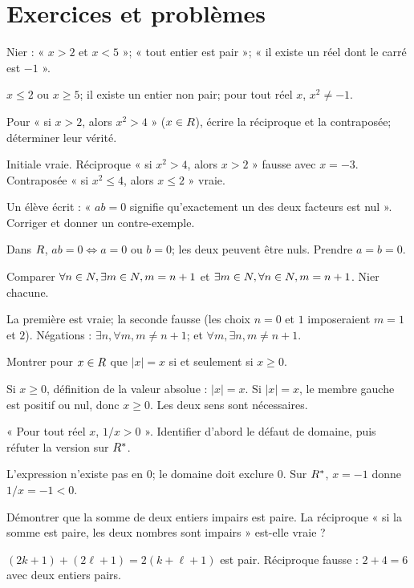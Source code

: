 \section{Exercices et problèmes}
\exo[Nier]\label{t11s-c06-e01}
Nier : « $x>2$ et $x<5$ »; « tout entier est pair »; « il existe un réel dont le carré est $-1$ ».
\begin{corrige}\label{sol-t11s-c06-e01}
$x\le2$ ou $x\ge5$; il existe un entier non pair; pour tout réel $x$, $x^2\ne-1$.
\end{corrige}
\exo[Implications]\label{t11s-c06-e02}
Pour « si $x>2$, alors $x^2>4$ » ($x\in R$), écrire la réciproque et la contraposée; déterminer leur vérité.
\begin{corrige}\label{sol-t11s-c06-e02}
Initiale vraie. Réciproque « si $x^2>4$, alors $x>2$ » fausse avec $x=-3$. Contraposée « si $x^2\le4$, alors $x\le2$ » vraie.
\end{corrige}
\exo[Un ou inclusif]\label{t11s-c06-e03}
Un élève écrit : « $ab=0$ signifie qu’exactement un des deux facteurs est nul ». Corriger et donner un contre-exemple.
\begin{corrige}\label{sol-t11s-c06-e03}
Dans $R$, $ab=0\Leftrightarrow a=0$ ou $b=0$; les deux peuvent être nuls. Prendre $a=b=0$.
\end{corrige}
\label{t11s-c06-e04}
Comparer $\forall n\in N,\exists m\in N,m=n+1$ et $\exists m\in N,\forall n\in N,m=n+1$. Nier chacune.
\begin{corrige}\label{sol-t11s-c06-e04}
La première est vraie; la seconde fausse (les choix $n=0$ et $1$ imposeraient $m=1$ et $2$). Négations : $\exists n,\forall m,m\ne n+1$; et $\forall m,\exists n,m\ne n+1$.
\end{corrige}
\label{t11s-c06-e05}
Montrer pour $x\in R$ que $|x|=x$ si et seulement si $x\ge0$.
\begin{corrige}\label{sol-t11s-c06-e05}
Si $x\ge0$, définition de la valeur absolue : $|x|=x$. Si $|x|=x$, le membre gauche est positif ou nul, donc $x\ge0$. Les deux sens sont nécessaires.
\end{corrige}
\label{t11s-c06-e06}
« Pour tout réel $x$, $1/x>0$ ». Identifier d’abord le défaut de domaine, puis réfuter la version sur $R^*$.
\begin{corrige}\label{sol-t11s-c06-e06}
L’expression n’existe pas en $0$; le domaine doit exclure $0$. Sur $R^*$, $x=-1$ donne $1/x=-1<0$.
\end{corrige}
\exo[Divisibilité]\label{t11s-c06-e07}
Démontrer que la somme de deux entiers impairs est paire. La réciproque « si la somme est paire, les deux nombres sont impairs » est-elle vraie ?
\begin{corrige}\label{sol-t11s-c06-e07}
$(2k+1)+(2\ell+1)=2(k+\ell+1)$ est pair. Réciproque fausse : $2+4=6$ avec deux entiers pairs.
\end{corrige}

